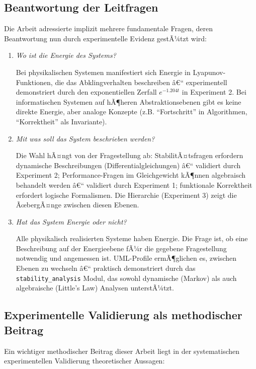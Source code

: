 ﻿\documentclass[a4paper,12pt]{scrreprt}
\theoremstyle{definition}
\begin{document}
\subsection{Beantwortung der Leitfragen}

Die Arbeit adressierte implizit mehrere fundamentale Fragen, deren Beantwortung nun durch experimentelle Evidenz gestÃ¼tzt wird:

\begin{enumerate}
	\item[-] \textit{Wo ist die Energie des Systems?} 
	
	Bei physikalischen Systemen manifestiert sich Energie in Lyapunov-Funktionen, die das Abklingverhalten beschreiben â€“ experimentell demonstriert durch den exponentiellen Zerfall $e^{-1.204t}$ in Experiment 2. Bei informatischen Systemen auf hÃ¶heren Abstraktionsebenen gibt es keine direkte Energie, aber analoge Konzepte (z.B. ``Fortschritt'' in Algorithmen, ``Korrektheit'' als Invariante).
	
	\item[-] \textit{Mit was soll das System beschrieben werden?}
	
	Die Wahl hÃ¤ngt von der Fragestellung ab: StabilitÃ¤tsfragen erfordern dynamische Beschreibungen (Differentialgleichungen) â€“ validiert durch Experiment 2; Performance-Fragen im Gleichgewicht kÃ¶nnen algebraisch behandelt werden â€“ validiert durch Experiment 1; funktionale Korrektheit erfordert logische Formalismen. Die Hierarchie (Experiment 3) zeigt die ÃœbergÃ¤nge zwischen diesen Ebenen.
	
	\item[-] \textit{Hat das System Energie oder nicht?}
	
	Alle physikalisch realisierten Systeme haben Energie. Die Frage ist, ob eine Beschreibung auf der Energieebene fÃ¼r die gegebene Fragestellung notwendig und angemessen ist. UML-Profile ermÃ¶glichen es, zwischen Ebenen zu wechseln â€“ praktisch demonstriert durch das \texttt{stability\_analysis} Modul, das sowohl dynamische (Markov) als auch algebraische (Little's Law) Analysen unterstÃ¼tzt.
\end{enumerate}

\subsection{Experimentelle Validierung als methodischer Beitrag}

Ein wichtiger methodischer Beitrag dieser Arbeit liegt in der systematischen experimentellen Validierung theoretischer Aussagen:
\end{document}
